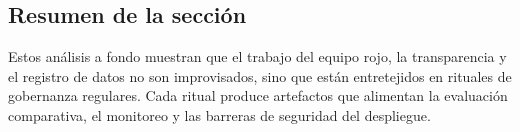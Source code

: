 \subsection{Resumen de la sección}

Estos análisis a fondo muestran que el trabajo del equipo rojo, la transparencia y el registro de datos no son improvisados, sino que están entretejidos en rituales de gobernanza regulares. Cada ritual produce artefactos que alimentan la evaluación comparativa, el monitoreo y las barreras de seguridad del despliegue.
